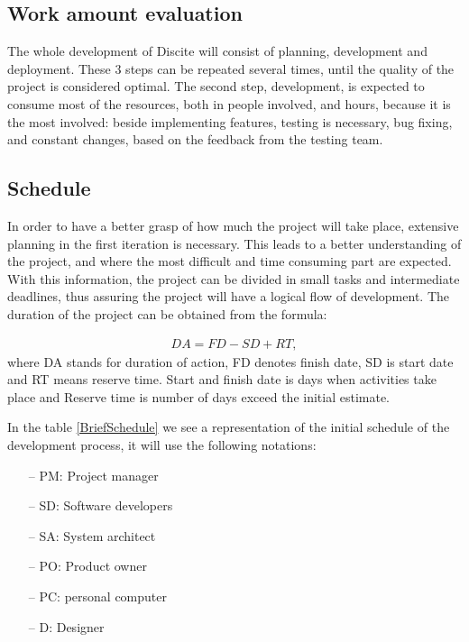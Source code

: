\subsection{Work amount evaluation}
The whole development of Discite will consist of planning, development and
deployment. These 3 steps can be repeated several times, until the quality of
the project is considered optimal. The second step, development, is expected to
consume most of the resources, both in people involved, and hours, because it is
the most involved: beside implementing features, testing is necessary, bug
fixing, and constant changes, based on the feedback from the testing team.

\subsection{Schedule}
In order to have a better grasp of how much the project will take place,
extensive planning in the first iteration is necessary. This leads to a better
understanding of the project, and where the most difficult and time consuming
part are expected. With this information, the project can be divided in small
tasks and intermediate deadlines, thus assuring the project will have a logical
flow of development.
The duration of the project can be obtained from the formula:

\begin{eqnarray}
DA = FD - SD + RT, \label{4.1}
\end{eqnarray}
where DA stands for duration of action, FD denotes finish date, SD is start date
and RT means  reserve time.  Start and finish date is days when activities take
place and Reserve time is number of days exceed the initial estimate.

In the table \ref{BriefSchedule} we see a representation of the initial schedule
of the development process, it will use the following notations:
\begin{enumerate}
    \item[--] PM: Project manager
    \item[--] SD: Software developers
    \item[--] SA: System architect
    \item[--] PO: Product owner
    \item[--] PC: personal computer
    \item[--] D: Designer
\end{enumerate}
\newcommand{\specialcell}[2][c]{%
  \begin{tabular}[#1]{@{}c@{}}#2\end{tabular}}

